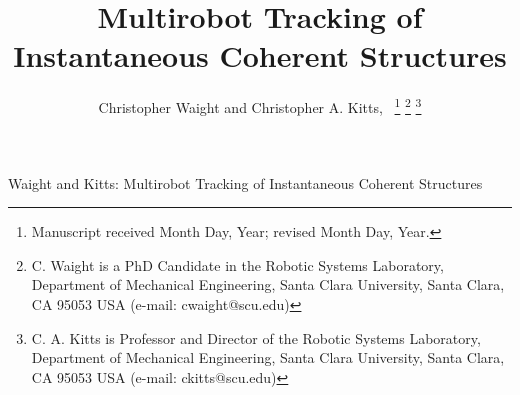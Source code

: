 \documentclass[lettersize,journal]{IEEEtran}
\begin{document}
\title{Multirobot Tracking of
Instantaneous Coherent Structures}

\author{Christopher Waight and Christopher A. Kitts,~
\thanks{Manuscript received Month Day, Year; revised Month Day, Year.}
\thanks{C. Waight is a PhD Candidate in the Robotic Systems Laboratory, Department of Mechanical
Engineering, Santa Clara University, Santa Clara, CA 95053 USA (e-mail: cwaight@scu.edu)}
\thanks{C. A. Kitts is Professor and Director of the Robotic Systems Laboratory, Department of
Mechanical Engineering, Santa Clara University, Santa Clara, CA 95053 USA (e-mail: ckitts@scu.edu)}
}
%
{Waight and Kitts: Multirobot Tracking of Instantaneous Coherent Structures}

\maketitle
\end{document}
